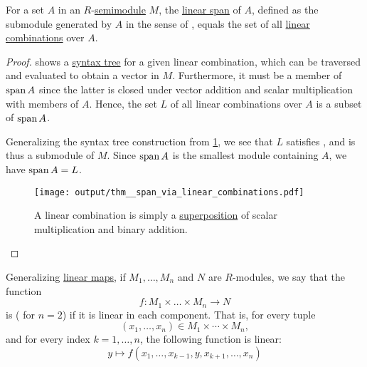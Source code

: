 \begin{proposition}\label{thm:span_via_linear_combinations}
  For a set \( A \) in an \( R \)-\hyperref[def:semimodule]{semimodule} \( M \), the \hyperref[def:semimodule/submodel]{linear span} of \( A \), defined as the submodule generated by \( A \) in the sense of , equals the set of all \hyperref[def:linear_combination]{linear combinations} over \( A \).
\end{proposition}
\begin{proof}
   shows a \hyperref[def:concrete_syntax_tree]{syntax tree} for a given linear combination, which can be traversed and evaluated to obtain a vector in \( M \). Furthermore, it must be a member of \( \operatorname{span} A \) since the latter is closed under vector addition and scalar multiplication with members of \( A \). Hence, the set \( L \) of all linear combinations over \( A \) is a subset of \( \operatorname{span} A \).

  Generalizing the syntax tree construction from \cref{fig:thm:span_via_linear_combinations}, we see that \( L \) satisfies , and is thus a submodule of \( M \). Since \( \operatorname{span} A \) is the smallest module containing \( A \), we have \( \operatorname{span} A = L \).

  \begin{figure}[h]
    \hfill
    \texttt{[image: output/thm\_\_span\_via\_linear\_combinations.pdf]}
    \hfill\hfill
    \caption{A linear combination is simply a \hyperref[def:multi_valued_function/superposition]{superposition} of scalar multiplication and binary addition.}
    \label{fig:thm:span_via_linear_combinations}
  \end{figure}
\end{proof}

\begin{definition}\label{def:multilinear_function}\mimprovised
  Generalizing \hyperref[def:semimodule/homomorphism]{linear maps}, if \( M_1, \ldots, M_n \) and \( N \) are \( R \)-modules, we say that the function
  \begin{equation*}
    f: M_1 \times \ldots \times M_n \to N
  \end{equation*}
  is  ( for \( n = 2 \)) if it is linear in each component. That is, for every tuple
  \begin{equation*}
    (x_1, \ldots, x_n) \in M_1 \times \cdots \times M_n,
  \end{equation*}
  and for every index \( k = 1, \ldots, n \), the following function is linear:
  \begin{equation*}
    y \mapsto f(x_1, \ldots, x_{k-1}, y, x_{k+1}, \ldots, x_n)
  \end{equation*}
\end{definition}

